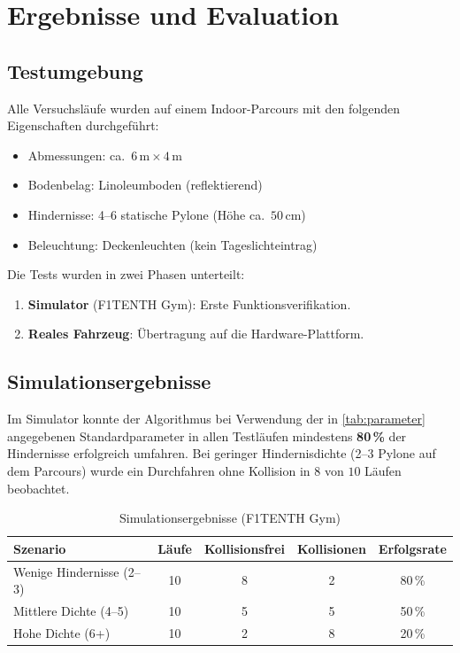 \chapter{Ergebnisse und Evaluation}
\label{chap:ergebnisse}

\section{Testumgebung}
\label{sec:test_env}

Alle Versuchsläufe wurden auf einem Indoor-Parcours mit den
folgenden Eigenschaften durchgeführt:

\begin{itemize}
  \item Abmessungen: ca.\ $6\,\text{m} \times 4\,\text{m}$
  \item Bodenbelag: Linoleumboden (reflektierend)
  \item Hindernisse: 4--6 statische Pylone (Höhe ca.\ $50\,\text{cm}$)
  \item Beleuchtung: Deckenleuchten (kein Tages\-lichteintrag)
\end{itemize}

Die Tests wurden in zwei Phasen unterteilt:
\begin{enumerate}
  \item \textbf{Simulator} (F1TENTH Gym): Erste Funktionsverifikation.
  \item \textbf{Reales Fahrzeug}: Übertragung auf die Hardware-Plattform.
\end{enumerate}

\section{Simulationsergebnisse}
\label{sec:sim_results}

Im Simulator konnte der Algorithmus bei Verwendung der in
\cref{tab:parameter} angegebenen Standardparameter in allen
Testläufen mindestens \textbf{80\,\%} der Hindernisse erfolgreich
umfahren.
Bei geringer Hindernisdichte (2--3 Pylone auf dem Parcours)
wurde ein Durchfahren ohne Kollision in \(8\) von \(10\) Läufen
beobachtet.

\begin{table}[H]
  \centering
  \caption{Simulationsergebnisse (F1TENTH Gym)}
  \label{tab:sim_results}
  \begin{tabular}{@{}lcccc@{}}
    \toprule
    \textbf{Szenario}  & \textbf{Läufe}
      & \textbf{Kollisionsfrei} & \textbf{Kollisionen}
      & \textbf{Erfolgsrate} \\
    \midrule
    Wenige Hindernisse (2--3)  & 10 & 8 & 2 & 80\,\% \\
    Mittlere Dichte (4--5)     & 10 & 5 & 5 & 50\,\% \\
    Hohe Dichte (6+)           & 10 & 2 & 8 & 20\,\% \\
    \bottomrule
  \end{tabular}
\end{table}

